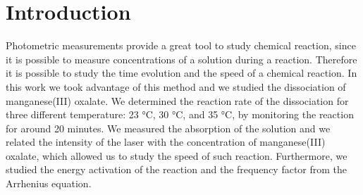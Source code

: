 \documentclass[a4paper,10pt]{article}
\begin{document}
\section{Introduction}
Photometric measurements provide a great tool to study chemical reaction, since it is possible to measure concentrations of a solution during a reaction. Therefore it is possible to study the time evolution and the speed of a chemical reaction. In this work we took advantage of this method and we studied the dissociation of manganese(III) oxalate. We determined the reaction rate of the dissociation for three different temperature: 23 °C, 30 °C, and 35 °C, by monitoring the reaction for around 20 minutes. We measured the absorption of the solution and we related the intensity of the laser with the concentration of manganese(III) oxalate, which allowed us to study the speed of such reaction. Furthermore, we studied the energy activation of the reaction and the frequency factor from the Arrhenius equation.
\end{document}
